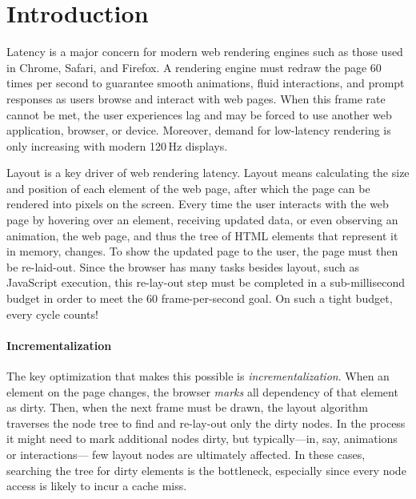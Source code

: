 
\section{Introduction}

Latency is a major concern for modern web rendering engines
  such as those used in Chrome, Safari, and Firefox.
A rendering engine
  must redraw the page 60 times per second
  to guarantee smooth animations, fluid interactions, and prompt responses
  as users browse and interact with web pages.
When this frame rate cannot be met,
  the user experiences lag and may be forced to use another web application, browser, or device.
Moreover, demand for low-latency rendering is only increasing
  with modern 120\,Hz displays.

Layout is a key driver of web rendering latency.
Layout means calculating the size and position
  of each element of the web page,
  after which the page can be rendered into pixels on the screen.
Every time the user interacts with the web page
  by hovering over an element,
  receiving updated data,
  or even observing an animation,
  the web page, and thus
  the tree of HTML elements that represent it in memory,
  changes.
To show the updated page to the user,
  the page must then be re-laid-out.
Since the browser has many tasks besides layout,
  such as JavaScript execution,
  this re-lay-out step must be completed in a sub-millisecond budget 
  in order to meet the 60 frame-per-second goal.
On such a tight budget, every cycle counts!

\paragraph{Incrementalization}
The key optimization that makes this possible
  is \emph{incrementalization}.
When an element on the page changes,
  the browser \emph{marks} 
  all dependency of that element as dirty.
Then, when the next frame must be drawn,
  the layout algorithm traverses the node tree
  to find and re-lay-out only the dirty nodes.
In the process it might need to mark additional nodes dirty,
  but typically---in, say, animations or interactions---%
  few layout nodes are ultimately affected.
In these cases, searching the tree
  for dirty elements is the bottleneck,
  especially since every node access
  is likely to incur a cache miss.

